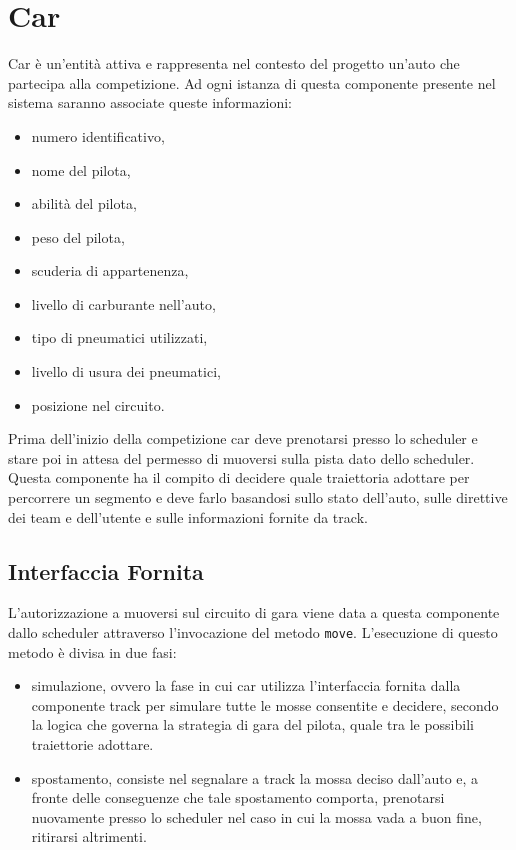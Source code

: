 \documentclass[11pt,a4paper]{report}
\newcommand{\fun}[1]{\texttt{#1}}
\begin{document}
\section{Car}
Car è un'entità attiva e rappresenta nel contesto del progetto un'auto che partecipa alla competizione. Ad ogni istanza di questa componente presente nel sistema saranno associate queste informazioni:
\begin{itemize}
\item numero identificativo,
\item nome del pilota,
\item abilità del pilota,
\item peso del pilota,
\item scuderia di appartenenza,
\item livello di carburante nell'auto,
\item tipo di pneumatici utilizzati,
\item livello di usura dei pneumatici,
\item posizione nel circuito.
\end{itemize}
Prima dell'inizio della competizione car deve prenotarsi presso lo scheduler e stare poi in attesa del permesso di muoversi sulla pista dato dello scheduler.
Questa componente ha il compito di decidere quale traiettoria adottare per percorrere un segmento e deve farlo basandosi sullo stato dell'auto, sulle direttive dei team e dell'utente e sulle informazioni fornite da track.
\subsection*{Interfaccia Fornita}
L'autorizzazione a muoversi sul circuito di gara viene data a questa componente dallo scheduler attraverso l'invocazione del metodo \fun{move}. L'esecuzione di questo metodo è divisa in due fasi:
\begin{itemize}
\item simulazione, ovvero la fase in cui car utilizza l'interfaccia fornita dalla componente track per simulare tutte le mosse consentite e decidere, secondo la logica che governa la strategia di gara del pilota, quale tra le possibili traiettorie adottare.
\item spostamento, consiste nel segnalare a track la mossa deciso dall'auto e, a fronte delle conseguenze che tale spostamento comporta, prenotarsi nuovamente presso lo scheduler nel caso in cui la mossa vada a buon fine, ritirarsi altrimenti.
\end{itemize}
\end{document}
